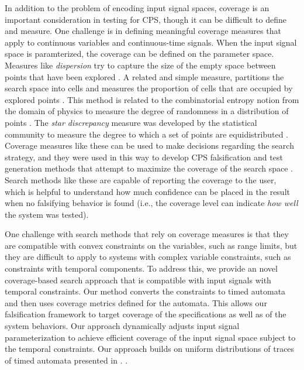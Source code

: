 In addition to the problem of encoding input signal spaces, coverage is an important consideration in testing for CPS, though it can be 
difficult to define and measure.
One challenge is in defining meaningful coverage measures that apply to continuous
variables and continuous-time signals. When the input signal space is paramterized, the coverage can be defined on the parameter space. 
Measures like \emph{dispersion} try to capture the size of the empty space between points that have been explored \cite{Esposito04}.
A related and simple measure, partitions the search space into cells and measures the proportion of cells that are occupied by explored points \cite{Skruch2011}.
This method is related to the combinatorial entropy notion from the domain of physics to measure the degree of randomness in a distribution of points \cite{Gabbay06}.
The \emph{star discrepancy} measure was developed by the statistical community 
to measure the degree to which a set of points are equidistributed
\cite{Heinrich03}. 
Coverage measures like these can be used to make decisions regarding the search strategy, and they were used in this way to develop CPS falsification and test generation methods that attempt to maximize the coverage of the search space \cite{DangN09,Dreossi2015,CAV2017}. Search methods like these are capable of reporting the coverage to the user, which is helpful to understand how much confidence 
can be placed in the result when no falsifying behavior is found (i.e., the coverage level can indicate \emph{how well} the system was tested). 

One challenge with search methods that rely on coverage measures  is that they are compatible with convex constraints on the variables, such as range limits, 
but they are difficult to apply to systems with complex variable constraints, such as constraints with temporal components.
To address this, we provide an novel coverage-based search approach that is compatible with input signals with temporal constraints. Our method converts the constraints to 
timed automata and then uses coverage metrics defined for the automata.
This allows our falsification framework to target coverage of the specifications as well as of the system behaviors.
Our approach dynamically adjusts input signal parameterization to achieve
efficient coverage of the input signal space subject to
the temporal constraints. Our approach builds on uniform
distributions of traces of timed automata presented in \cite{}.
.

